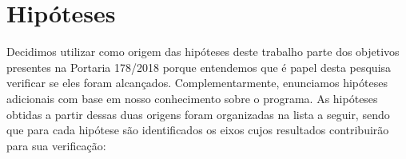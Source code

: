 \documentclass[
12pt,		%
openright,	%
twoside,  %
a4paper,			%
chapter=TITLE,		%
english,			%
french,				%
spanish,			%
brazil				%
]{USPSC-classe/USPSC}
\begin{document}
\section[Hip\'oteses]{Hip\'oteses}\label{Hip\'oteses}
Decidimos utilizar como origem das hip\'oteses deste trabalho parte dos objetivos presentes na Portaria 178/2018 porque entendemos que \'e papel desta pesquisa verificar se eles foram alcan\c{c}ados. Complementarmente, enunciamos hip\'oteses adicionais com base em nosso conhecimento sobre o programa. As hip\'oteses obtidas a partir dessas duas origens foram organizadas na lista a seguir, sendo que para cada hip\'otese s\~ao identificados os eixos cujos resultados contribuir\~ao para sua verifica\c{c}\~ao:
\end{document}

